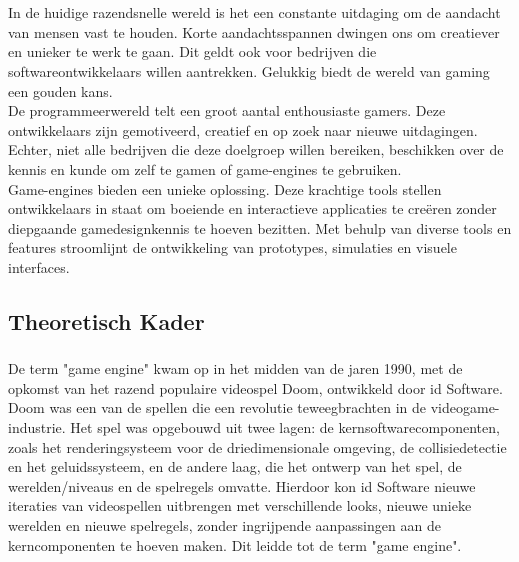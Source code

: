\chapter{}%
\label{ch:stand-van-zaken}

In de huidige razendsnelle wereld is het een constante uitdaging om de aandacht van mensen vast te houden. Korte aandachtsspannen dwingen ons om creatiever en unieker te werk te gaan. Dit geldt ook voor bedrijven die softwareontwikkelaars willen aantrekken. Gelukkig biedt de wereld van gaming een gouden kans.
\\
De programmeerwereld telt een groot aantal enthousiaste gamers. Deze ontwikkelaars zijn gemotiveerd, creatief en op zoek naar nieuwe uitdagingen. Echter, niet alle bedrijven die deze doelgroep willen bereiken, beschikken over de kennis en kunde om zelf te gamen of game-engines te gebruiken.
\\
Game-engines bieden een unieke oplossing. Deze krachtige tools stellen ontwikkelaars in staat om boeiende en interactieve applicaties te creëren zonder diepgaande gamedesignkennis te hoeven bezitten. Met behulp van diverse tools en features stroomlijnt de ontwikkeling van prototypes, simulaties en visuele interfaces.

\section{Theoretisch Kader}
\subsection{}%
\label{sec:game-engines}
De term "game engine" kwam op in het midden van de jaren 1990, met de opkomst van het razend populaire videospel Doom, ontwikkeld door id Software. Doom was een van de spellen die een revolutie teweegbrachten in de videogame-industrie. Het spel was opgebouwd uit twee lagen: de kernsoftwarecomponenten, zoals het renderingsysteem voor de driedimensionale omgeving, de collisiedetectie en het geluidssysteem, en de andere laag, die het ontwerp van het spel, de werelden/niveaus en de spelregels omvatte. Hierdoor kon id Software nieuwe iteraties van videospellen uitbrengen met verschillende looks, nieuwe unieke werelden en nieuwe spelregels, zonder ingrijpende aanpassingen aan de kerncomponenten te hoeven maken. Dit leidde tot de term "game engine". \cite{gregory2018game}

